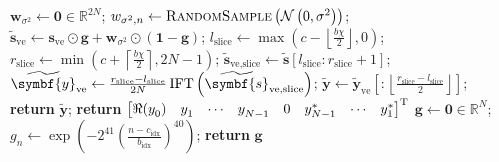 \begin{algorithm}
\begin{algorithmic}
            \State $\symbf{w}_{\sigma^2} \gets \symbf{0} \in \mathbb{R}^{2N}$;
            \State $w_{\sigma^2,n} \gets \textsc{RandomSample}\left(\mathcal{N}\left(0, \sigma^2\right)\right)$;
            \EndFor
            \State $\widetilde{\symbf{s}}_{\text{ve}} \gets \symbf{s}_{\text{ve}} \odot \symbf{g} + \symbf{w}_{\sigma^2} \odot \left(\symbf{1} - \symbf{g}\right)$;
            \State $l_{\text{slice}} \gets \max\left( c - \left \lfloor \frac{b \chi}{2} \right \rfloor, 0 \right)$;
            \State $r_{\text{slice}} \gets \min\left( c + \left \lceil \frac{b \chi}{2} \right \rceil, 2N - 1 \right)$;
            \State $\widetilde{\symbf{s}}_{\text{ve,slice}} \gets \widetilde{\symbf{s}} [l_{\text{slice}} : r_{\text{slice}} + 1]$;
            \State $\widetilde{\symbf{y}}_{\text{ve}} \gets
                \frac{r_{\text{slice}} - l_{\text{slice}}}{2N} \IFT \left(
                \widetilde{\symbf{s}}_{\text{ve,slice}} \right)$;
            \State $\widetilde{\symbf{y}} \gets \widetilde{\symbf{y}}_{\text{ve}}
                \left[:\left \lfloor \frac{r_{\text{slice}} - l_{\text{slice}}}{2}\right \rfloor \right]$;
            \State \textbf{return} $\widetilde{\symbf{y}}$;
        \EndProcedure
        \Statex
            \State \textbf{return} $
            \begin{bmatrix}
                \Re(y_0^{\vphantom{*}}) & y_1^{\vphantom{*}} & \cdots & y_{N-1}^{\vphantom{*}} & 0 & y_{N-1}^* & \cdots & y_1^*
            \end{bmatrix}^{\mathrm{T}}
            $
        \EndProcedure
        \Statex
            \State $\symbf{g} \gets \symbf{0} \in \mathbb{R}^{N}$;
                \State $g_n \gets \exp\left(
                    -2^{41} \left(
                        \frac{n - c_{\text{idx}}}{b_{\text{idx}}}
                    \right)^{40}
                    \right)
                $;
            \EndFor
            \State \textbf{return} $\symbf{g}$
        \EndProcedure
    \end{algorithmic}
\end{algorithm}
